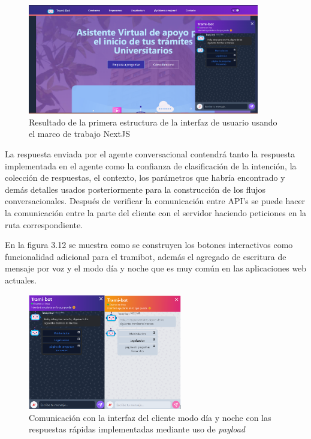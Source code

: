 \documentclass[letter, openright, 12pt]{book}
\begin{document}
\begin{figure}[H]
\centering
\includegraphics[width=0.9\textwidth]{figura3_12}
 \caption{Resultado de la primera estructura de la interfaz de usuario usando el marco de trabajo NextJS}
\label{fig:figura3_12}
\end{figure}

La respuesta enviada por el agente conversacional contendrá tanto la respuesta implementada en el agente como la confianza de clasificación de la intención, la colección de respuestas, el contexto, los parámetros que habría encontrado y demás detalles usados posteriormente para la construcción de los flujos conversacionales. 
Después de verificar la comunicación entre API’s se puede hacer la comunicación entre la parte del cliente con el servidor haciendo peticiones en la ruta correspondiente. 
\par
En la figura 3.12 se muestra como se construyen los botones interactivos como funcionalidad adicional para el tramibot, además el agregado de escritura de mensaje por voz y el modo día y noche que es muy común en las aplicaciones web actuales. 

\begin{figure}[H]
\centering
\includegraphics[width=0.6\textwidth]{figura3_13}
 \caption{Comunicación con la interfaz del cliente modo día y noche con las respuestas rápidas implementadas mediante uso de {\it payload}}
\label{fig:figura3_13}
\end{figure}
\end{document}
